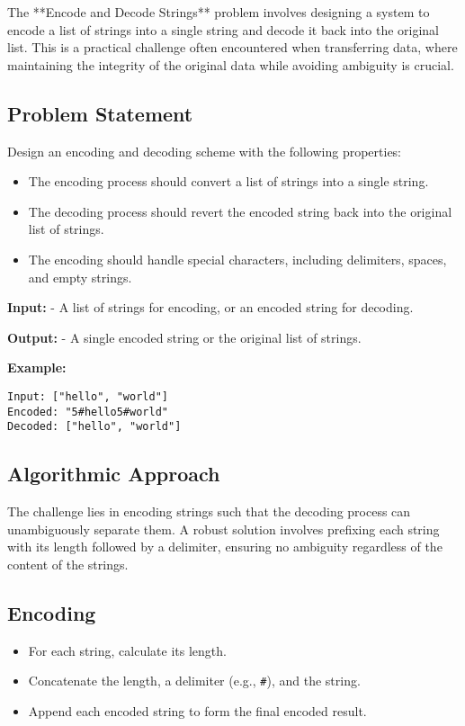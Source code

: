 
\label{problem:Encode_and_Decode_Strings}

The **Encode and Decode Strings** problem involves designing a system to encode a list of strings into a single string and decode it back into the original list. This is a practical challenge often encountered when transferring data, where maintaining the integrity of the original data while avoiding ambiguity is crucial.

\subsection*{Problem Statement}
Design an encoding and decoding scheme with the following properties:
\begin{itemize}
    \item The encoding process should convert a list of strings into a single string.
    \item The decoding process should revert the encoded string back into the original list of strings.
    \item The encoding should handle special characters, including delimiters, spaces, and empty strings.
\end{itemize}

\textbf{Input:}
- A list of strings for encoding, or an encoded string for decoding.

\textbf{Output:}
- A single encoded string or the original list of strings.

\textbf{Example:}
\begin{verbatim}
Input: ["hello", "world"]
Encoded: "5#hello5#world"
Decoded: ["hello", "world"]
\end{verbatim}

\subsection*{Algorithmic Approach}
The challenge lies in encoding strings such that the decoding process can unambiguously separate them. A robust solution involves prefixing each string with its length followed by a delimiter, ensuring no ambiguity regardless of the content of the strings.

\subsection*{Encoding}
\begin{itemize}
    \item For each string, calculate its length.
    \item Concatenate the length, a delimiter (e.g., \texttt{\#}), and the string.
    \item Append each encoded string to form the final encoded result.
\end{itemize}

